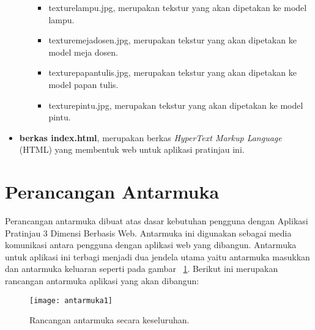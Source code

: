 \begin{itemize}
\begin{itemize}
\begin{itemize}
			\item texturelampu.jpg, merupakan tekstur yang akan dipetakan ke model lampu.
			\item texturemejadosen.jpg, merupakan tekstur yang akan dipetakan ke model meja dosen.
			\item texturepapantulis.jpg, merupakan tekstur yang akan dipetakan ke model papan tulis.
			\item texturepintu.jpg, merupakan tekstur yang akan dipetakan ke model pintu.
		\end{itemize} 
	\end{itemize}
	\item {\bf berkas index.html}, merupakan berkas {\it HyperText Markup Language} (HTML) yang membentuk web untuk aplikasi pratinjau ini.
\end{itemize}

\section{Perancangan Antarmuka}
\label{sec:perancanganAntarmuka}
Perancangan antarmuka dibuat atas dasar kebutuhan pengguna dengan Aplikasi Pratinjau 3 Dimensi Berbasis Web. Antarmuka ini digunakan sebagai media komunikasi antara pengguna dengan aplikasi web yang dibangun. Antarmuka untuk aplikasi ini terbagi menjadi dua jendela utama yaitu antarmuka masukkan dan antarmuka keluaran seperti pada gambar ~\ref{fig:antarmuka1}. Berikut ini merupakan rancangan antarmuka aplikasi yang akan dibangun:
\begin{figure}[ht]
	\centering
	\texttt{[image: antarmuka1]}
	\caption{Rancangan antarmuka secara keseluruhan.}
	\label{fig:antarmuka1}
	\vspace{8mm}
\end{figure}

